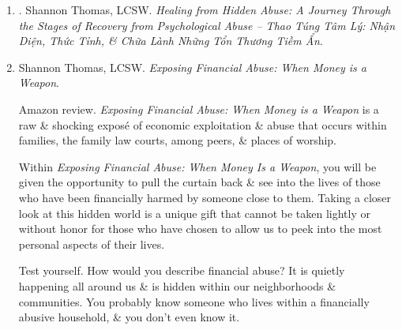\documentclass{article}
\begin{document}
\begin{enumerate}
	Bridging clinical advice with pop culture language, {\sc Thomas} approaches her counseling work \& writing from the lens of a therapist \& as a fellow survivor of psychological abuse. Her 1st book, {\it Healing from Hidden Abuse}, is an international bestseller, has been published in multiple languages, \& serves as a road map for book studies \& host groups in 11 countries \& 35 states across the United States. {\sc Thomas} also coined the ``6 Stages of Healing from Hidden Abuse'' model, which has been met with favorable reviews \& high applause from readers \& medical professionals across the world.
	
	{\sc Thomas} has been featured in top media outlets including The Oprah Magazine, Associated Press, Business Insider, Reader's Digest, Yahoo!, Yahoo! Finance, Teen Vogue, Elite Daily, \& Bustle.
	
	\item \cite{Thomas_psychological_manipulation_VN}. {\sc Shannon Thomas, LCSW}. {\it Healing from Hidden Abuse: A Journey Through the Stages of Recovery from Psychological Abuse -- Thao Túng Tâm Lý: Nhận Diện, Thức Tỉnh, \& Chữa Lành Những Tổn Thương Tiềm Ẩn}.\hfill{\sf[done]}
	
	\item {\sc Shannon Thomas, LCSW}. {\it Exposing Financial Abuse: When Money is a Weapon}. {}
	
	{\sf Amazon review.} {\it Exposing Financial Abuse: When Money is a Weapon} is a raw \& shocking expos\'e of economic exploitation \& abuse that occurs within families, the family law courts, among peers, \& places of worship.
	
	Within {\it Exposing Financial Abuse: When Money Is a Weapon}, you will be given the opportunity to pull the curtain back \& see into the lives of those who have been financially harmed by someone close to them. Taking a closer look at this hidden world is a unique gift that cannot be taken lightly or without honor for those who have chosen to allow us to peek into the most personal aspects of their lives.
	
	Test yourself. How would you describe financial abuse? It is quietly happening all around us \& is hidden within our neighborhoods \& communities. You probably know someone who lives within a financially abusive household, \& you don't even know it.
	

\end{enumerate}
\end{document}
